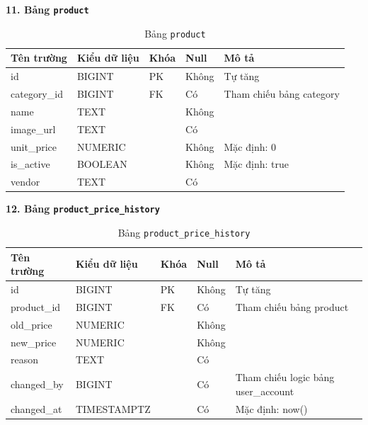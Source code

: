 \documentclass[12pt,a4paper]{report}
\begin{document}
\textbf{11. Bảng \texttt{product}}
\vspace{0.1cm}
\begin{longtable}{|>{\ttfamily}p{3.5cm}|p{2.5cm}|p{1.5cm}|p{1.5cm}|p{5cm}|}
\caption{Bảng \texttt{product}} \label{tab:db_product} \\
\hline
\normalfont\textbf{Tên trường} & \textbf{Kiểu dữ liệu} & \textbf{Khóa} & \textbf{Null} & \textbf{Mô tả} \\ \hline
id & BIGINT & PK & Không & Tự tăng \\ \hline
category\_id & BIGINT & FK & Có & Tham chiếu bảng category \\ \hline
name & TEXT & & Không & \\ \hline
image\_url & TEXT & & Có & \\ \hline
unit\_price & NUMERIC & & Không & Mặc định: 0 \\ \hline
is\_active & BOOLEAN & & Không & Mặc định: true \\ \hline
vendor & TEXT & & Có & \\ \hline
\end{longtable}

\vspace{0.3cm}
\textbf{12. Bảng \texttt{product\_price\_history}}
\vspace{0.1cm}
\begin{longtable}{|>{\ttfamily}p{3.5cm}|p{2.5cm}|p{1.5cm}|p{1.5cm}|p{5cm}|}
\caption{Bảng \texttt{product\_price\_history}} \label{tab:db_product_price_history} \\
\hline
\normalfont\textbf{Tên trường} & \textbf{Kiểu dữ liệu} & \textbf{Khóa} & \textbf{Null} & \textbf{Mô tả} \\ \hline
id & BIGINT & PK & Không & Tự tăng \\ \hline
product\_id & BIGINT & FK & Có & Tham chiếu bảng product \\ \hline
old\_price & NUMERIC & & Không & \\ \hline
new\_price & NUMERIC & & Không & \\ \hline
reason & TEXT & & Có & \\ \hline
changed\_by & BIGINT & & Có & Tham chiếu logic bảng user\_account \\ \hline
changed\_at & TIMESTAMPTZ & & Có & Mặc định: now() \\ \hline
\end{longtable}
\end{document}
